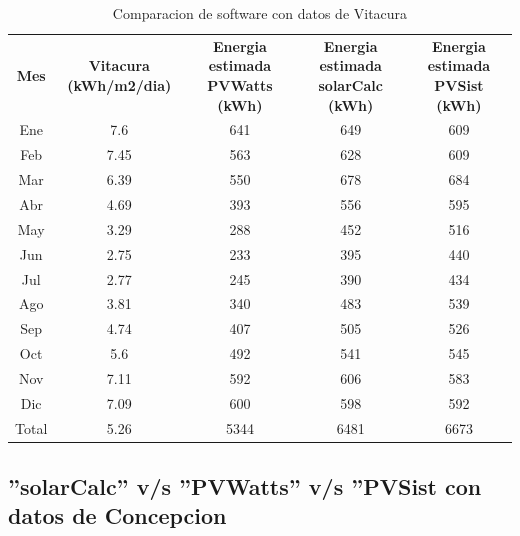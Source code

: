\begin{table}[h!]
\caption{Comparacion de software con datos de Vitacura}
\begin{tabular}{|c|c|c|c|c|}
        \hline
	\textbf{Mes}&\textbf{Vitacura (kWh/m2/dia)}&\textbf{Energia estimada PVWatts (kWh)}&\textbf{Energia estimada solarCalc (kWh)}&\textbf{Energia estimada PVSist (kWh)}\\
	Ene&	7.6&	641&	649&	609\\
        \hline
	Feb&	7.45&	563&	628&	609\\
        \hline
	Mar&	6.39&	550&	678&	684\\
        \hline
	Abr&	4.69&	393&	556&	595\\
        \hline
	May&	3.29&	288&	452&	516\\
        \hline
	Jun&	2.75&	233&	395&	440\\
        \hline
	Jul&	2.77&	245&	390&	434\\
        \hline
	Ago&	3.81&	340&	483&	539\\
        \hline
	Sep&	4.74&	407&	505&	526\\
        \hline
	Oct&	5.6&	492&	541&	545\\
        \hline
	Nov&	7.11&	592&	606&	583\\
        \hline
	Dic&	7.09&	600&	598&	592\\
        \hline
	Total&	5.26&	5344&	6481&	6673\\
        \hline
\end{tabular}
\end{table}

\subsection{''solarCalc'' v/s ''PVWatts'' v/s ''PVSist con datos de Concepcion}


